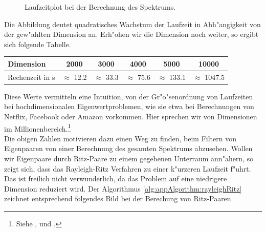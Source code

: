 \begin{figure}[h!]
\centering


\caption{Laufzeitplot bei der Berechnung des Spektrums.}\label{fig:chap5:laufzeit}
\end{figure}

Die Abbildung deutet quadratisches Wachstum der Laufzeit in Abh"angigkeit von der gew"ahlten Dimension an.
 Erh"ohen wir die Dimension noch weiter, so ergibt sich folgende Tabelle.

\begin{center}
\begin{tabular}{lccccc}
Dimension & 2000 & 3000 & 4000 & 5000 & 10000 \\
\hline
Rechenzeit in s & $\approx$ 12.2 & $\approx$ 33.3 & $\approx$ 75.6 & $\approx$ 133.1 & $\approx$ 1047.5
\end{tabular}
\end{center}

Diese Werte vermitteln eine Intuition, von der Gr"o"senordnung von Laufzeiten bei hochdimensionalen Eigenwertproblemen, wie sie etwa bei Berechnungen von Netflix, Facebook oder Amazon vorkommen. Hier sprechen wir von Dimensionen im Millionenbereich.\footnote{Siehe \cite{facebook}, \cite{amazon} und \cite{netflix}.}\\

Die obigen Zahlen motivieren dazu einen Weg zu finden, beim Filtern von Eigenpaaren von einer Berechnung des gesamten Spektrums abzusehen. Wollen wir Eigenpaare durch Ritz-Paare zu einem gegebenen Unterraum ann"ahern, so zeigt sich, dass das Rayleigh-Ritz Verfahren zu einer k"urzeren Laufzeit f"uhrt. Das ist freilich nicht verwunderlich, da das Problem auf eine niedrigere Dimension reduziert wird. Der Algorithmus \ref{alg:appAlgorithm:rayleighRitz} zeichnet entsprechend folgendes Bild bei der Berechung von Ritz-Paaren.

